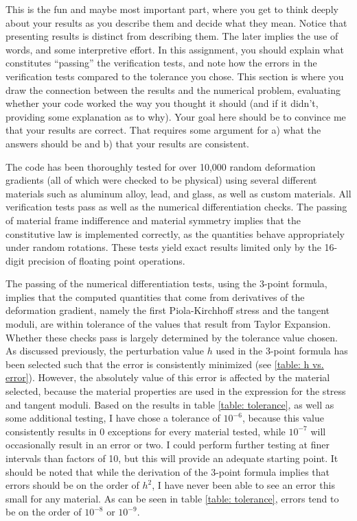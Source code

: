 \documentclass[]{spie}  %
\begin{document}
This is the fun and maybe most important part, where you get to think deeply about your results as you describe them and decide what they mean. Notice that presenting results is distinct from describing them. The later implies the use of words, and some interpretive effort. In this assignment, you should explain what constitutes “passing” the verification tests, and note how the errors in the verification tests compared to the tolerance you chose. This section is where you draw the connection between the results and the numerical problem, evaluating whether your code worked the way you thought it should (and if it didn't, providing some explanation as to why). Your goal here should be to convince me that your results are correct. That requires some argument for a) what the answers should be and b) that your results are consistent.

The code has been thoroughly tested for over 10,000 random deformation gradients (all of which were checked to be physical) using several different materials such as aluminum alloy, lead, and glass, as well as custom materials. All verification tests pass as well as the numerical differentiation checks. The passing of material frame indifference and material symmetry implies that the constitutive law is implemented correctly, as the quantities behave appropriately under random rotations. These tests yield exact results limited only by the 16-digit precision of floating point operations. 

The passing of the numerical differentiation tests, using the 3-point formula, implies that the computed quantities that come from derivatives of the deformation gradient, namely the first Piola-Kirchhoff stress and the tangent moduli, are within tolerance of the values that result from Taylor Expansion. Whether these checks pass is largely determined by the tolerance value chosen. As discussed previously, the perturbation value $h$ used in the 3-point formula has been selected such that the error is consistently minimized (see \ref{table: h vs. error}). However, the absolutely value of this error is affected by the material selected, because the material properties are used in the expression for the stress and tangent moduli. Based on the results in table \ref{table: tolerance}, as well as some additional testing, I have chose a tolerance of $10^{-6}$, because this value consistently results in 0 exceptions for every material tested, while $10^{-7}$ will occasionally result in an error or two. I could perform further testing at finer intervals than factors of 10, but this will provide an adequate starting point. It should be noted that while the derivation of the 3-point formula implies that errors should be on the order of $h^2$, I have never been able to see an error this small for any material. As can be seen in table \ref{table: tolerance}, errors tend to be on the order of $10^{-8}$ or $10^{-9}$. 
\end{document}
